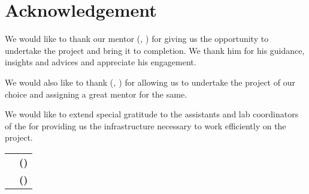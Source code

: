 \clearpage
\chapter*{Acknowledgement}
\label{cha:acknowledgement}
We would like to thank our mentor \textbf{\mentorName{}} (\textit{\mentorJobTitle{}, \departmentName{}}) for giving us the opportunity to undertake the project and bring it to completion. We thank him for his guidance, insights and advices and appreciate his engagement.

We would also like to thank \textbf{\headOfDeptName{}} (\textit{\headOfDeptJobTitle{}, \departmentName{}}) for allowing us to undertake the project of our choice and assigning a great mentor for the same.

We would like to extend special gratitude to the assistants and lab coordinators of the \departmentName{} for providing us the infrastructure necessary to work efficiently on the project.

\vfill

\begin{center}
    \begin{tabularx}{\textwidth}{L R}
        & \textbf{\authorAshhar{} (\authorAshharRoll{})}\\
        & \textbf{\authorAdeela{} (\authorAdeelaRoll{})}\\
    \end{tabularx}
\end{center}

